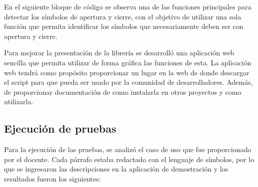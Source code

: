 

En el siguiente bloque de código se observa una de las funciones principales para detectar los símbolos de apertura y cierre, con el objetivo de utilizar una sola función que permita identificar los símbolos que necesariamente deben ser con apertura y cierre. 



Para mejorar la presentación de la librería se desarrolló una aplicación web sencilla que permita utilizar de forma gráfica las funciones de esta. La aplicación web tendrá como propósito proporcionar un lugar en la web de donde descargar el script para que pueda ser usado por la comunidad de desarrolladores. Además, de proporcionar documentación de como instalarla en otros proyectos y como utilizarla. 

\subsection{Ejecución de pruebas}

Para la ejecución de las pruebas, se analizó el caso de uso que fue proporcionado por el docente. Cada párrafo estaba redactado con el lenguaje de símbolos, por lo que se ingresaron las descripciones en la aplicación de demostración y los resultados fueron los siguientes:

